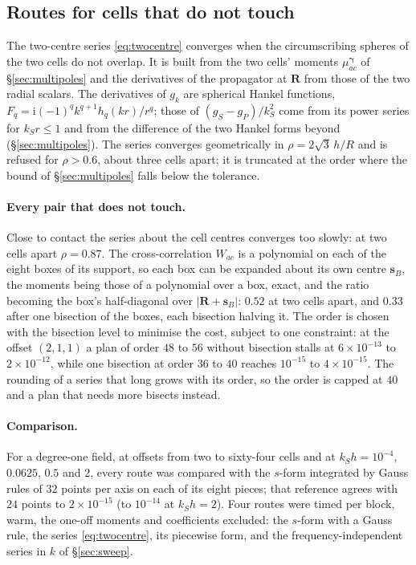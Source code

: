 \documentclass[11pt,a4paper]{article}
\newcommand{\bR}{\mathbf{R}}
\newcommand{\bs}{\mathbf{s}}
\begin{document}
\subsection{Routes for cells that do not touch}\label{sec:routes}

The two-centre series \eqref{eq:twocentre} converges when the circumscribing spheres of the two cells do
not overlap. It is built from the two cells' moments $\mu^{\boldsymbol\gamma}_{ac}$ of \S\ref{sec:multipoles} and the derivatives
of the propagator at $\bR$ from those of the two radial scalars. The derivatives of $g_k$ are spherical
Hankel functions, $F_q=\mathrm{i}(-1)^qk^{q+1}h_q(kr)/r^q$; those of $(g_S-g_P)/k_S^2$ come from its power
series for $k_Sr\le1$ and from the difference of the two Hankel forms beyond
(\S\ref{sec:multipoles}). The series converges geometrically in $\rho=2\sqrt3\,h/R$ and is refused for
$\rho>0.6$, about three cells apart; it is truncated at the order where the bound of
\S\ref{sec:multipoles} falls below the tolerance.

\paragraph{Every pair that does not touch.} Close to contact the series about the cell centres converges
too slowly: at two cells apart $\rho=0.87$. The cross-correlation $W_{ac}$ is a polynomial on each of the
eight boxes of its support, so each box can be expanded about its own centre $\bs_B$, the moments being
those of a polynomial over a box, exact, and the ratio becoming the box's half-diagonal over
$|\bR+\bs_B|$: $0.52$ at two cells apart, and $0.33$ after one bisection of the boxes, each bisection
halving it. The order is chosen with the bisection level to
minimise the cost, subject to one constraint: at the offset $(2,1,1)$ a plan of order $48$ to $56$
without bisection stalls at $6\times10^{-13}$ to $2\times10^{-12}$, while one bisection at order $36$ to $40$
reaches $10^{-15}$ to $4\times10^{-15}$. The rounding of a series that long grows
with its order, so the order is capped at $40$ and a plan that needs more bisects instead.

\paragraph{Comparison.} For a degree-one field, at offsets from two to sixty-four cells and at
$k_Sh=10^{-4}$, $0.0625$, $0.5$ and $2$, every route was compared with the $s$-form integrated by Gauss
rules of $32$ points per axis on each of its eight pieces; that reference agrees with $24$ points to
$2\times10^{-15}$ (to $10^{-14}$ at $k_Sh=2$). Four routes were timed per block, warm, the one-off
moments and coefficients excluded: the $s$-form with a Gauss rule, the series
\eqref{eq:twocentre}, its piecewise form, and the frequency-independent series in $k$ of
\S\ref{sec:sweep}.
\end{document}
